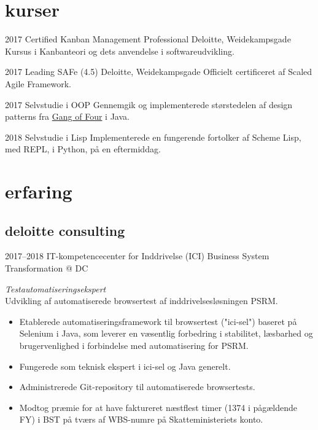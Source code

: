 \documentclass[]{../friggeri-cv} %
\begin{document}
\section{kurser}
\begin{entrylist}


\entry
{2017}
{Certified Kanban Management Professional}
{Deloitte, Weidekampsgade}
{Kursus i Kanbanteori og dets anvendelse i softwareudvikling.}

\entry
{2017}
{Leading SAFe (4.5)}
{Deloitte, Weidekampsgade}
{Officielt certificeret af Scaled Agile Framework.}

\entry
{2017}
{Selvstudie {\normalfont i OOP}}
{}
{Gennemgik og implementerede størstedelen af design patterns fra \href{https://books.google.dk/books?id=6oHuKQe3TjQC}{Gang of Four} i Java.}


\entry
{2018}
{Selvstudie {\normalfont i Lisp}}
{}
{Implementerede en fungerende fortolker af Scheme Lisp, med REPL, i Python, på en eftermiddag.}

\end{entrylist}


\section{erfaring}

\subsection{deloitte consulting}

\begin{entrylist}
\entry
{2017--2018}
{IT-kompetencecenter for Inddrivelse (ICI)}
{Business System Transformation @ DC}
{\emph{Testautomatiseringsekspert}\\
Udvikling af automatiserede browsertest af inddrivelsesløsningen PSRM. 
\begin{itemize}
\item Etablerede automatiseringsframework til browsertest ("ici-sel") baseret på Selenium i Java, som leverer en væsentlig forbedring i stabilitet, læsbarhed og brugervenlighed i forbindelse med automatisering for PSRM. 
\item Fungerede som teknisk ekspert i ici-sel og Java generelt. 
\item Administrerede Git-repository til automatiserede browsertests. 
\item Modtog præmie for at have faktureret næstflest timer (1374 i pågældende FY) i BST på tværs af WBS-numre på Skatteministeriets konto.
\end{itemize}
}

\end{entrylist}
\end{document}
